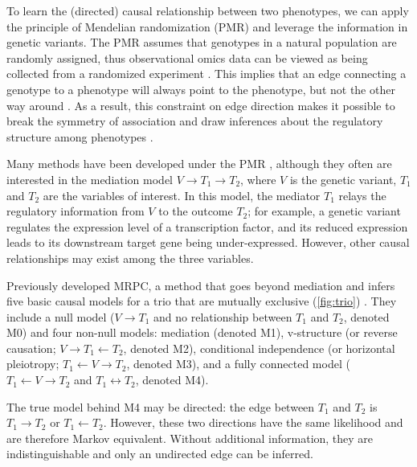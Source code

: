 \documentclass[12pt,letterpaper]{report}
\begin{document}
\begin{doublespace}
To learn the (directed) causal relationship between two phenotypes, we can apply the principle of Mendelian randomization (PMR) and leverage the information in genetic variants. The PMR assumes that genotypes in a natural population are randomly assigned, thus observational omics data can be viewed as being collected from a randomized experiment \cite{davey2014mendelian, aten2008using}. This implies that an edge connecting a genotype to a phenotype will always point to the phenotype, but not the other way around \cite{badsha2019learning, yazdani2016generating}. As a result, this constraint on edge direction makes it possible to break the symmetry of association and draw inferences about the regulatory structure among phenotypes \cite{badsha2019learning, ludl2021comparison, davey2014mendelian}.   

Many methods have been developed under the PMR \cite{wang2014.network, wang2017efficient, millstein2009cit, zeng2021statistical, badsha2019learning}, although they often are interested in the mediation model $V \rightarrow T_1 \rightarrow T_2$, where $V$ is the genetic variant, $T_1$ and $T_2$ are the variables of interest. In this model, the mediator $T_1$ relays the regulatory information from $V$ to the outcome $T_2$; for example, a genetic variant regulates the expression level of a transcription factor, and its reduced expression leads to its downstream target gene being under-expressed. However, other causal relationships may exist among the three variables. 

Previously \cite{badsha2019learning} developed MRPC, a method that goes beyond mediation and infers five basic causal models for a trio that are mutually exclusive (\autoref{fig:trio}) \cite{badsha2019learning, badsha2021mrpc}. They include a null model ($V \rightarrow T_1$ and no relationship between $T_1$ and $T_2$, denoted M0) and four non-null models: mediation (denoted M1), v-structure (or reverse causation; $V \rightarrow T_1 \leftarrow T_2$, denoted M2), conditional independence (or horizontal pleiotropy; $T_1 \leftarrow V \rightarrow T_2$, denoted M3), and a fully connected model ($T_1 \leftarrow V \rightarrow T_2$ and $T_1 \leftrightarrow T_2$, denoted M4). 

The true model behind M4 may be directed: the edge between $T_1$ and $T_2$ is $T_1 \rightarrow T_2$ or $T_1 \leftarrow T_2$.  However, these two directions have the same likelihood and are therefore Markov equivalent. Without additional information, they are indistinguishable and only an undirected edge can be inferred.   


\end{doublespace}
\end{document}
